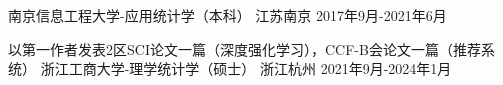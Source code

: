 \begin{educventries}
  \educventry
    {} %
    {南京信息工程大学-应用统计学（本科）} %
    {江苏南京} %
    {2017年9月-2021年6月} %

  \educventry
    {以第一作者发表2区SCI论文一篇（深度强化学习），CCF-B会论文一篇（推荐系统）} %
    {浙江工商大学-理学统计学（硕士）} %
    {浙江杭州} %
    {2021年9月-2024年1月} %

\end{educventries}
